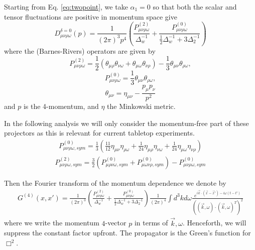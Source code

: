 \documentclass[aps,preprintnumbers,superscriptaddress,longbibliography]{revtex4-1}
\begin{document}
Starting from Eq. \eqref{eq:twopoint}, we
take $\alpha_1=0$ so that both the scalar and tensor fluctuations are positive in momentum space give
\begin{equation}
    D^{\delta=0}_{\mu \nu \rho \omega}(p)=
    \frac{1}{(2\pi)^3 p^4}\left(\frac{P^{(2)}_{\mu \nu \rho \omega}}{\Delta_w^{-1}}+\frac{P^{(0)}_{\mu \nu \rho \omega}}{\frac{1}{2}\Delta_w^{-1}+3\Delta_2^{-1}}\right)
\label{eq:twopoint1}
\end{equation}
%
where the (Barnes-Rivers) operators are given by~\cite{stelle1977renormalization}
\begin{equation}
    P^{(2)}_{\mu \nu \rho \omega}=\frac{1}{2}(\theta_{\mu\rho}\theta_{\nu\omega}+\theta_{\mu\omega}\theta_{\nu\rho})-\frac{1}{3}\theta_{\mu \nu}\theta_{\rho \omega},
    \label{Proj-2}
\end{equation}
\begin{equation}
\label{Proj-0}
    P^{(0)}_{\mu \nu \rho \omega}=\frac{1}{3}\theta_{\mu \nu}\theta_{\rho \omega},
\end{equation}
\begin{equation}
    \theta_{\mu\nu}=\eta_{\mu \nu}-\frac{p_{\mu}p_{\nu}}{p^2}
\end{equation}
and $p$ is the 4-momentum, and $\eta$ the Minkowski metric. 

In the following analysis we will only consider the  momentum-free part of these projectors as this is relevant for current tabletop experiments. 
\begin{align}
    P^{(0)}_{\mu \nu \rho \omega,sym}=\frac{1}{3}\left(\frac{11}{12}\eta_{\mu \nu}\eta_{ \rho \omega} +\frac{1}{24}\eta_{\mu \rho}\eta_{\nu \omega}+\frac{1}{24}\eta_{\mu \omega}\eta_{\nu \rho}\right)
\end{align}
\begin{align}
      P^{(2)}_{\mu \nu \rho \omega,sym}= \frac{3}{2}(P^{(0)}_{\mu \rho \nu \omega,sym}+ P^{(0)}_{\mu \omega \nu \rho,sym})-P^{(0)}_{\mu \nu \rho \omega,sym}
\end{align}

Then the Fourier transform of the momentum dependence we denote by 
\begin{align}
    G^{(4)}(x,x')=
    \frac{1}{(2\pi)^3}\left(\frac{P^{(2)}_{\mu \nu \rho \omega}}{\Delta_w^{-1}}+\frac{P^{(0)}_{\mu \nu \rho \omega}}{\frac{1}{2}\Delta_w^{-1}+3\Delta_2^{-1}}\right)\frac{1}{ (2\pi)^4 }\int d^3kd\omega \frac{ e^{i\vec{k}\cdot(\vec{x}-\vec{x}')-i\omega (t-t')}}{\left((\vec{k},\omega)\cdot (\vec{k},\omega)^T\right)^2 }
\label{eq:Fourier1}
\end{align} 
where we write the momentum $4$-vector $p$ in terms of $\vec{k},\omega$. Henceforth, we will suppress the constant factor upfront.
The propagator is the Green's function for $\Box^2$. 
\end{document}
